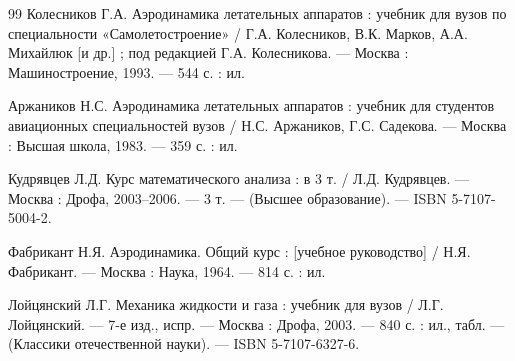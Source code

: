 	\newpage
	\begin{thebibliography}{99}
		 Колесников Г.А. Аэродинамика летательных аппаратов : учебник для вузов по специальности «Самолетостроение» / Г.А. Колесников, В.К. Марков, А.А. Михайлюк [и др.] ; под редакцией Г.А. Колесникова. --- Москва : Машиностроение, 1993. --- 544 с. : ил.
		
		 Аржаников Н.С. Аэродинамика летательных аппаратов : учебник для студентов авиационных специальностей вузов / Н.С. Аржаников, Г.С. Садекова. --- Москва : Высшая школа, 1983. --- 359 с. : ил.
		
		 Кудрявцев Л.Д. Курс математического анализа : в 3 т. / Л.Д. Кудрявцев. --- Москва : Дрофа, 2003–2006. --- 3 т. --- (Высшее образование). --- ISBN 5-7107-5004-2.
		
		 Фабрикант Н.Я. Аэродинамика. Общий курс : [учебное руководство] / Н.Я. Фабрикант. --- Москва : Наука, 1964. --- 814 с. : ил.
		
		 Лойцянский Л.Г. Механика жидкости и газа : учебник для вузов / Л.Г. Лойцянский. --- 7-е изд., испр. --- Москва : Дрофа, 2003. --- 840 с. : ил., табл. --- (Классики отечественной науки). --- ISBN 5-7107-6327-6.
	\end{thebibliography}
